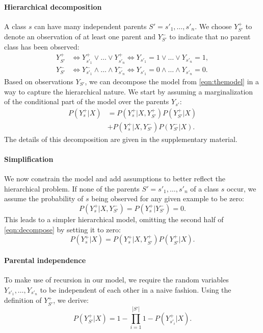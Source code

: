 \documentclass[10pt,twocolumn,letterpaper]{article}
\begin{document}
\paragraph{Hierarchical decomposition}
A class $s$ can have many independent parents $S'=s'_1,\ldots,s'_n$. We choose $Y_{S'}^+$ to denote
an observation of at least one parent and $Y_{S'}^-$ to indicate that no parent class
has been observed:
\begin{eqnarray*}
Y_{S'}^+ & \Leftrightarrow Y_{s'_1}^+ \vee \ldots \vee Y_{s'_n}^+   \Leftrightarrow Y_{s'_1}=1 \vee \ldots \vee Y_{s'_n}=1,\\
Y_{S'}^- & \Leftrightarrow Y_{s'_1}^- \land \ldots \land Y_{s'_n}^- \Leftrightarrow Y_{s'_1}=0 \land \ldots \land Y_{s'_n}=0.
\end{eqnarray*}
Based on observations $Y_{S'}$, we can decompose the model from \cref{eqn:themodel}
in a way to capture the hierarchical nature. We start by assuming a marginalization
of the conditional part of the model over the parents $Y_{s'}$:
\begin{equation}
\begin{split}
P(Y_s^+|X) &= P(Y_s^+|X, Y_{S'}^+)P(Y_{S'}^+|X)\\
&+ P(Y_s^+|X, Y_{S'}^-)P(Y_{S'}^-|X).
\end{split}
\label{eqn:decompose}
\end{equation}
The details of this decomposition are given in the supplementary material.

\paragraph{Simplification}
We now constrain the model and add assumptions to better reflect the hierarchical problem.
If none of the parents $S'=s'_1,\ldots,s'_n$ of a class $s$ occur, we assume the
probability of $s$ being observed for any given example to be zero:
\begin{equation}
P(Y_s^+ | X, Y_{S'}^-) = P(Y_s^+ | Y_{S'}^-) = 0.
\label{eqn:hcritzero}
\end{equation}
This leads to a simpler hierarchical model, omitting the second half of \cref{eqn:decompose}
by setting it to zero:
\begin{equation}
P(Y_s^+|X) = P(Y_s^+|X, Y_{S'}^+)P(Y_{S'}^+|X).
\end{equation}

\paragraph{Parental independence}
To make use of recursion in our model, we require the random variables $Y_{s'_1}, \ldots, Y_{s'_n}$
to be independent of each other in a naive fashion. Using the definition of $Y_{S'}^+$, we
derive:
\begin{equation}
P(Y_{S'}^+|X) = 1 - \prod_{i=1}^{|S'|}{1-P(Y_{s'_i}^+|X)}.
\label{eqn:parindep}
\end{equation} 
\end{document}
